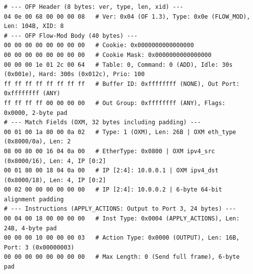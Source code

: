 \begin{lstlisting}[basicstyle=\ttfamily\scriptsize, caption={Byte-Accurate Hex Dump of OFPFlowMod Installation Message (OpenFlow 1.3.5)}, label={lst:flow_mod_hex}]
# --- OFP Header (8 bytes: ver, type, len, xid) ---
04 0e 00 68 00 00 00 08   # Ver: 0x04 (OF 1.3), Type: 0x0e (FLOW_MOD), Len: 104B, XID: 8
# --- OFP Flow-Mod Body (40 bytes) ---
00 00 00 00 00 00 00 00   # Cookie: 0x0000000000000000
00 00 00 00 00 00 00 00   # Cookie Mask: 0x0000000000000000
00 00 00 1e 01 2c 00 64   # Table: 0, Command: 0 (ADD), Idle: 30s (0x001e), Hard: 300s (0x012c), Prio: 100
ff ff ff ff ff ff ff ff   # Buffer ID: 0xffffffff (NONE), Out Port: 0xffffffff (ANY)
ff ff ff ff 00 00 00 00   # Out Group: 0xffffffff (ANY), Flags: 0x0000, 2-byte pad
# --- Match Fields (OXM, 32 bytes including padding) ---
00 01 00 1a 80 00 0a 02   # Type: 1 (OXM), Len: 26B | OXM eth_type (0x8000/0a), Len: 2
08 00 80 00 16 04 0a 00   # EtherType: 0x0800 | OXM ipv4_src (0x8000/16), Len: 4, IP [0:2]
00 01 80 00 18 04 0a 00   # IP [2:4]: 10.0.0.1 | OXM ipv4_dst (0x8000/18), Len: 4, IP [0:2]
00 02 00 00 00 00 00 00   # IP [2:4]: 10.0.0.2 | 6-byte 64-bit alignment padding
# --- Instructions (APPLY_ACTIONS: Output to Port 3, 24 bytes) ---
00 04 00 18 00 00 00 00   # Inst Type: 0x0004 (APPLY_ACTIONS), Len: 24B, 4-byte pad
00 00 00 10 00 00 00 03   # Action Type: 0x0000 (OUTPUT), Len: 16B, Port: 3 (0x00000003)
00 00 00 00 00 00 00 00   # Max Length: 0 (Send full frame), 6-byte pad
\end{lstlisting}
